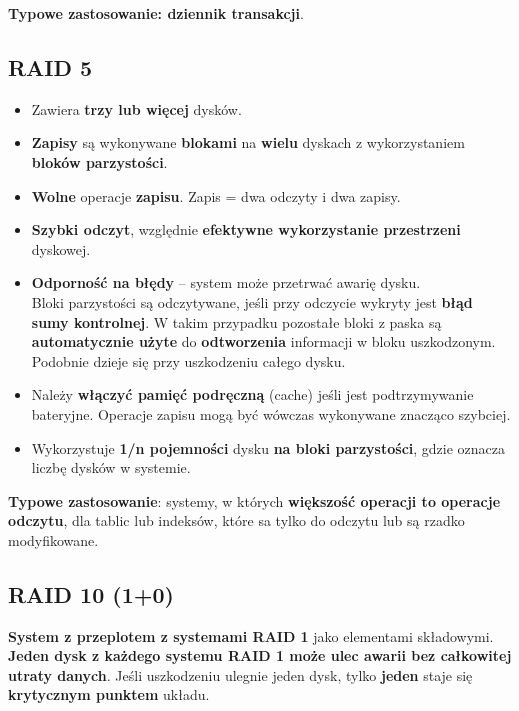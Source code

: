 \documentclass[a4paper]{article}
\begin{document}
\textbf{Typowe zastosowanie: dziennik transakcji}.

\subsection{RAID 5}
\begin{itemize}
    \item Zawiera \textbf{trzy lub więcej} dysków.
    \item \textbf{Zapisy} są wykonywane \textbf{blokami} na \textbf{wielu} dyskach z wykorzystaniem \textbf{bloków parzystości}. 
    \item \textbf{Wolne} operacje \textbf{zapisu}. Zapis = dwa odczyty i dwa zapisy.
    \item \textbf{Szybki odczyt}, względnie \textbf{efektywne wykorzystanie przestrzeni} dyskowej.
    \item \textbf{Odporność na błędy} – system może przetrwać awarię dysku.\\
    Bloki parzystości są odczytywane, jeśli przy odczycie wykryty jest \textbf{błąd sumy kontrolnej}. W takim przypadku pozostałe bloki z paska są \textbf{automatycznie użyte} do \textbf{odtworzenia} informacji w bloku uszkodzonym. Podobnie dzieje się przy uszkodzeniu całego dysku.
    \item Należy \textbf{włączyć pamięć podręczną} (cache) jeśli jest podtrzymywanie bateryjne. Operacje zapisu mogą być wówczas wykonywane znacząco szybciej.
    \item Wykorzystuje \textbf{1/n pojemności} dysku \textbf{na bloki parzystości}, gdzie oznacza liczbę dysków w systemie.
\end{itemize}


\textbf{Typowe zastosowanie}: systemy, w których
\textbf{większość operacji to operacje odczytu}, dla tablic lub indeksów, które sa tylko do odczytu lub są rzadko modyfikowane. 

\subsection{RAID 10 (1+0)}
\textbf{System z przeplotem z systemami RAID 1} jako elementami składowymi. \textbf{Jeden dysk z każdego systemu RAID 1 może ulec awarii bez całkowitej utraty danych}. Jeśli uszkodzeniu ulegnie jeden dysk, tylko \textbf{jeden} staje się \textbf{krytycznym punktem} układu.

\begin{center}
\end{center}
\end{document}
